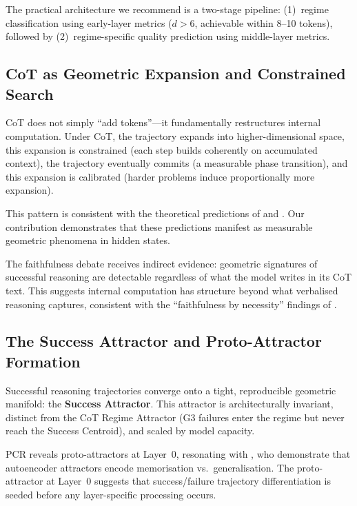 \documentclass[11pt,twocolumn]{article}
\begin{document}
The practical architecture we recommend is a two-stage pipeline: (1)~regime classification using early-layer metrics ($d > 6$, achievable within 8--10 tokens), followed by (2)~regime-specific quality prediction using middle-layer metrics.

\subsection{CoT as Geometric Expansion and Constrained Search}

CoT does not simply ``add tokens''---it fundamentally restructures internal computation. Under CoT, the trajectory expands into higher-dimensional space, this expansion is constrained (each step builds coherently on accumulated context), the trajectory eventually commits (a measurable phase transition), and this expansion is calibrated (harder problems induce proportionally more expansion).

This pattern is consistent with the theoretical predictions of \citet{feng2024towards} and \citet{merrill2024expressive}. Our contribution demonstrates that these predictions manifest as measurable geometric phenomena in hidden states.

The faithfulness debate receives indirect evidence: geometric signatures of successful reasoning are detectable regardless of what the model writes in its CoT text. This suggests internal computation has structure beyond what verbalised reasoning captures, consistent with the ``faithfulness by necessity'' findings of \citet{korbak2025faithfulness}.

\subsection{The Success Attractor and Proto-Attractor Formation}

Successful reasoning trajectories converge onto a tight, reproducible geometric manifold: the \textbf{Success Attractor}. This attractor is architecturally invariant, distinct from the CoT Regime Attractor (G3 failures enter the regime but never reach the Success Centroid), and scaled by model capacity.

PCR reveals proto-attractors at Layer~0, resonating with \citet{fumero2025latent}, who demonstrate that autoencoder attractors encode memorisation vs.\ generalisation. The proto-attractor at Layer~0 suggests that success/failure trajectory differentiation is seeded before any layer-specific processing occurs.
\end{document}
